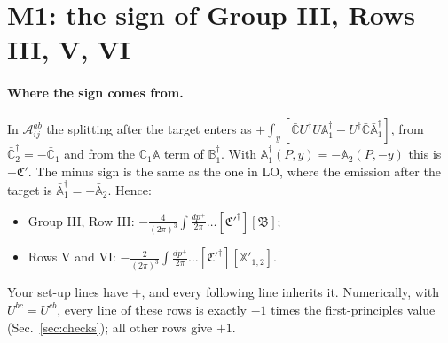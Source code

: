 \documentclass[10pt]{article}
\numberwithin{equation}{section}
\def\mf#1{\mathbb{#1}}
\begin{document}
\section{M1: the sign of Group III, Rows III, V, VI}\label{sec:M1}
\paragraph{Where the sign comes from.} In $\mathcal A^{ab}_{ij}$ the splitting after the target enters as $+\int_y[\bar{\mf C}U^\dagger U\mf A^\dagger_1-U^\dagger\bar{\mf C}\bar{\mf A}^\dagger_1]$, from $\bar{\mf C}^\dagger_2=-\bar{\mf C}_1$ and from the $\mf C_1\mf A$ term of $\mf B_1^\dagger$. With $\mf A^\dagger_1(P,y)=-\mf A_2(P,-y)$ this is $-\mathfrak C'$. The minus sign is the same as the one in LO, where the emission after the target is $\bar{\mf A}^\dagger_1=-\bar{\mf A}_2$. Hence:
\begin{itemize}
\item Group III, Row III: $-\frac{4}{(2\pi)^3}\int\frac{dp^+}{2\pi}\dots[\mathfrak C'^\dagger][\mathfrak B]$;
\item Rows V and VI: $-\frac{2}{(2\pi)^3}\int\frac{dp^+}{2\pi}\dots[\mathfrak C'^\dagger][\mathbb X'_{1,2}]$.
\end{itemize}
Your set-up lines have $+$, and every following line inherits it. Numerically, with $U^{bc}=U^{cb}$, every line of these rows is exactly $-1$ times the first-principles value (Sec.~\ref{sec:checks}); all other rows give $+1$.
\end{document}
